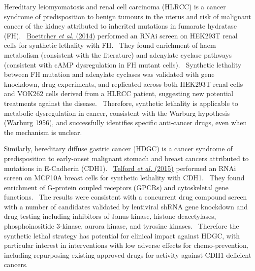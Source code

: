Hereditary leiomyomatosis and renal cell carcinoma (HLRCC) is a cancer
syndrome of predisposition to benign tumours in the uterus and risk of
malignant cancer of the kidney attributed to inherited mutations in
fumarate hydratase (FH).
\ \hyperlink{ENREF14}{Boettcher}\hyperlink{ENREF14}{\textit{ et
al.}}\hyperlink{ENREF14}{ (2014)} performed an RNAi screen on HEK293T
renal cells for synthetic lethality with FH. \ They found enrichment of
haem metabolism (consistent with the literature) and adenylate cyclase
pathways (consistent with cAMP dysregulation in FH mutant cells).
\ Synthetic lethality between FH mutation and adenylate cyclases was
validated with gene knockdown, drug experiments, and replicated across
both HEK293T renal cells and VOK262 cells derived from a HLRCC patient,
suggesting new potential treatments against the disease. \ Therefore,
synthetic lethality is applicable to metabolic dysregulation in cancer,
consistent with the Warburg hypothesis (Warburg 1956), and successfully
identifies specific anti-cancer drugs, even when the mechanism is
unclear. \


Similarly, hereditary diffuse gastric cancer (HDGC) is a cancer syndrome
of predisposition to early-onset malignant stomach and breast cancers
attributed to mutations in E-Cadherin (CDH1).
\ \hyperlink{ENREF94}{Telford}\hyperlink{ENREF94}{\textit{ et
al.}}\hyperlink{ENREF94}{ (2015)} performed an RNAi screen on MCF10A
breast cells for synthetic lethality with CDH1. \ They found enrichment
of G-protein coupled receptors (GPCRs) and cytoskeletal gene functions.
\ The results were consistent with a concurrent drug compound screen
with a number of candidates validated by lentiviral shRNA gene
knockdown and drug testing including inhibitors of Janus kinase,
histone deacetylases, phosphoinositide 3-kinase, aurora kinase, and
tyrosine kinases. \ Therefore the synthetic lethal strategy has
potential for clinical impact against HDGC, with particular interest in
interventions with low adverse effects for chemo-prevention, including
repurposing existing approved drugs for activity against CDH1 deficient
cancers. \ 


